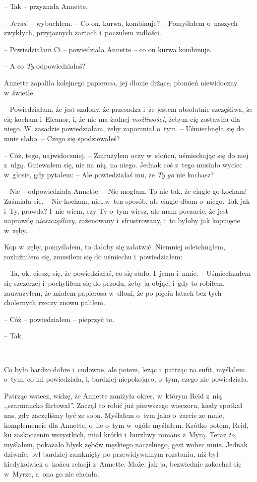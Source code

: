 \documentclass[oneside,polish,11pt,sfheadings]{mwbk}
\begin{document}
-- Tak -- przyznała Annette.

-- \emph{Jezus}! -- wybuchłem. -- Co on, kurwa, kombinuje? -- Pomyślałem o~naszych zwykłych, przyjaznych żartach i~poczułem mdłości.

-- Powiedziałam Ci -- powiedziała Annette -- co on kurwa kombinuje.

-- A co \emph{Ty} odpowiedziałaś?

Annette zapaliła kolejnego papierosa, jej dłonie drżące, płomień
niewidoczny w~świetle. 

-- Powiedziałam, że jest szalony, że przesadza i~że jestem absolutnie szczęśliwa, że cię kocham i~Eleanor, i, że nie ma
żadnej \emph{możliwości}, żebym cię zostawiła dla niego. W~zasadzie
powiedziałam, żeby zapomniał o~tym. -- Uśmiechnęła się do mnie słabo. -- Czego się spodziewałeś?

-- Cóż, tego, najwidoczniej. -- Zmrużyłem oczy w~słońcu, uśmiechając się
do niej z~ulgą. Gniewałem się, nie na nią, na niego. Jednak coś z~tego
musiało wyciec w~głosie, gdy pytałem: -- Ale powiedziałaś mu, że
\emph{Ty} \emph{go} nie kochasz?

-- Nie -- odpowiedziała Annette. -- Nie mogłam. To nie tak, że ciągle go
kocham! -- Zaśmiała się. -- Nie kocham, nie\ldots w~ten sposób, ale ciągle
dbam o~niego. Tak jak i~Ty, prawda? I~nie wiem, czy Ty o~tym wiesz, ale
mam poczucie, że jest naprawdę \emph{nieszczęśliwy}, zażenowany i~sfrustrowany, i~to byłoby jak kopnięcie w~zęby.

Kop w~zęby, pomyślałem, to dałoby się załatwić. Niemniej odetchnąłem,
rozluźniłem się, zmusiłem się do uśmiechu i~powiedziałem: 

-- Ta, ok, cieszę się, że powiedziałaś, co się stało. I~jemu i~mnie. -- Uśmiechnąłem
się szczerzej i~pochyliłem się do przodu, żeby ją objąć, i~gdy to
robiłem, zauważyłem, że miałem papierosa w~dłoni, że po pięciu latach
bez tych cholernych rzeczy znowu paliłem.

-- Cóż -- powiedziałem -- pieprzyć to.

-- Tak.

~

Co było bardzo dobre i~cudowne, ale potem, leżąc i~patrząc na sufit,
myślałem o~tym, co mi powiedziała, i, bardziej niepokojąco, o~tym, czego
nie powiedziała.

Patrząc wstecz, widzę, że Annette zaniżyła okres, w~którym Reid z~nią
,,szarmancko flirtował''. Zaczął to robić już pierwszego wieczoru, kiedy
spotkał nas, gdy zaczęliśmy być ze sobą. Myślałem o~tym jako o~żarcie ze
mnie, komplemencie dla Annette, o~ile o~tym w~ogóle myślałem. Krótko
potem, Reid, ku zaskoczeniu wszystkich, miał krótki i~burzliwy romans z~Myrą. Teraz \emph{to}, myślałem, pokazało błysk zębów męskiego
naczelnego, gest wobec mnie. Jednak dziwnie, był bardziej zamknięty po
przewidywalnym rozstaniu, niż był kiedykolwiek o~końcu relacji z~Annette. Może, jak ja, bezwiednie zakochał się w~Myrze, a~ona go nie
chciała.
\end{document}
